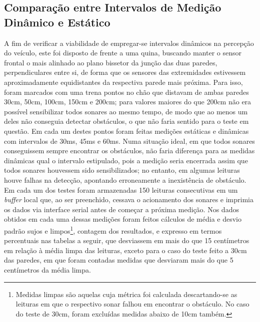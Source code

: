 \subsection{Comparação entre Intervalos de Medição Dinâmico e Estático}
A fim de verificar a viabilidade de empregar-se intervalos dinâmicos na percepção do veículo, este foi disposto de frente a uma quina, buscando 
manter o sensor frontal o mais alinhado ao plano bissetor da junção das duas paredes, perpendiculares entre si, de forma que os sensores das 
extremidades estivessem aproximadamente equidistantes da respectiva parede mais próxima. 
Para isso, foram marcados com uma trena pontos no chão que distavam de ambas paredes 30cm, 50cm, 100cm, 150cm e 200cm; para valores 
maiores do que 200cm não era possível sensibilizar todos sonares ao mesmo tempo, de modo que ao menos um deles não conseguia detectar obstáculos, o 
que não faria sentido para o teste em questão.
Em cada um destes pontos foram feitas medições estáticas e dinâmicas com intervalos de 30ms, 45ms e 60ms. Numa situação ideal, em que todos sonares 
conseguissem sempre encontrar os obstáculos, não faria diferença para as medidas dinâmicas qual o intervalo estipulado, pois a medição seria 
encerrada assim que todos sonares houvessem sido sensibilizados; no entanto, em algumas leituras houve falhas na detecção, apontando erroneamente a 
inexistência de obstáculo.
Em cada um dos testes foram armazenadas 150 leituras consecutivas em um \textit{buffer} local que, ao ser preenchido, cessava o acionamento dos 
sonares e imprimia os dados via interface serial antes de começar a próxima medição.
Nos dados obtidos em cada uma dessas medições foram feitos cálculos de média e desvio padrão sujos e limpos\footnote{Medidas limpas são aquelas cuja 
métrica foi calculada descartando-se as leituras em que o respectivo sonar falhou em encontrar o obstáculo. No caso do teste de 30cm, foram 
excluídas medidas abaixo de 10cm também.}, contagem dos resultados, e expresso em termos percentuais nas tabelas a seguir, que desviassem em mais do 
que 15 centímetros em relação à média limpa das leituras, exceto para o caso do teste feito a 30cm das paredes, em que foram contadas medidas que 
desviaram mais do que 5 centímetros da média limpa.

